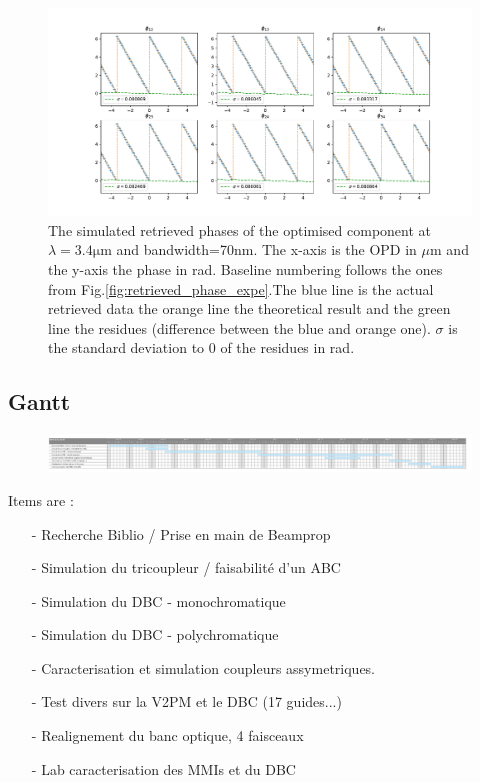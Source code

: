 \documentclass[a4paper,twoside,11pt]{article}
\begin{document}
    \begin{figure}[htbp!]
     \centering
     \includegraphics[scale=.4]{../picture/retrieve_phase_simu.pdf}
     \caption{The simulated retrieved phases of the optimised component at $\lambda=3.4\si{\micro\meter}$ and bandwidth=70nm. The x-axis is the OPD in $\mu$m and the y-axis the phase in rad. Baseline numbering follows the ones from Fig.\ref{fig:retrieved_phase_expe}.The blue line is the actual retrieved data the orange line the theoretical result and the green line the residues (difference between the blue and orange one). $\sigma$ is the standard deviation to 0 of the residues in rad.}
     \label{an:retrieved_phase_simu}
    \end{figure}

\newpage
\subsection{Gantt}
\begin{figure}[htbp!]
\centering
\includegraphics[scale=.5]{../picture/gantt.png}
\end{figure}

Items are :
\begin{itemize}
\item[-] Recherche Biblio / Prise en main de Beamprop
\item[-]Simulation du tricoupleur / faisabilité d'un ABC
\item[-]Simulation du DBC - monochromatique
\item[-]Simulation du DBC - polychromatique
\item[-]Caracterisation et simulation coupleurs assymetriques.
\item[-]Test divers sur la V2PM et le DBC (17 guides...)
\item[-]Realignement du banc optique, 4 faisceaux
\item[-]Lab caracterisation des MMIs et du DBC
\end{itemize}

\newpage
\printglossary

\newpage


\end{document}
